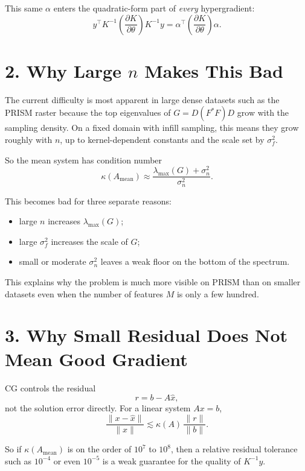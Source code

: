 \documentclass[11pt]{article}
\begin{document}
This same $\alpha$ enters the quadratic-form part of \emph{every}
hypergradient:
\begin{equation}
y^\top K^{-1} \left(\frac{\partial K}{\partial \theta}\right) K^{-1} y
=
\alpha^\top \left(\frac{\partial K}{\partial \theta}\right) \alpha.
\end{equation}

\section*{2. Why Large $n$ Makes This Bad}

The current difficulty is most apparent in large dense datasets such as the
PRISM raster because the top eigenvalues of $G = D(F^\ast F)D$ grow with the
sampling density. On a fixed domain with infill sampling, this means they grow
roughly with $n$, up to kernel-dependent constants and the scale set by
$\sigma_f^2$.

So the mean system has condition number
\begin{equation}
\kappa(A_{\mathrm{mean}})
\approx
\frac{\lambda_{\max}(G) + \sigma_n^2}{\sigma_n^2}.
\end{equation}

This becomes bad for three separate reasons:
\begin{itemize}
  \item large $n$ increases $\lambda_{\max}(G)$;
  \item large $\sigma_f^2$ increases the scale of $G$;
  \item small or moderate $\sigma_n^2$ leaves a weak floor on the bottom of the
  spectrum.
\end{itemize}

This explains why the problem is much more visible on PRISM than on smaller
datasets even when the number of features $M$ is only a few hundred.

\section*{3. Why Small Residual Does Not Mean Good Gradient}

CG controls the residual
\[
r = b - A \hat x,
\]
not the solution error directly. For a linear system $Ax = b$,
\begin{equation}
\frac{\|x - \hat x\|}{\|x\|}
\lesssim
\kappa(A)\,
\frac{\|r\|}{\|b\|}.
\end{equation}

So if $\kappa(A_{\mathrm{mean}})$ is on the order of $10^7$ to $10^8$, then a
relative residual tolerance such as $10^{-4}$ or even $10^{-5}$ is a weak
guarantee for the quality of $K^{-1}y$.
\end{document}
